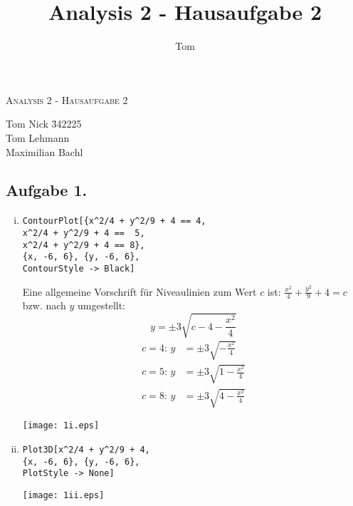 \documentclass[10pt,a4paper]{scrartcl}
\author{Tom}
\title{Analysis 2 - Hausaufgabe 2}
\begin{document}
\begin{center}
\textsc{\Large{Analysis 2 - Hausaufgabe 2}} \\
\end{center}
\begin{tabbing}
Tom Nick \hspace{1.4cm}\= 342225\\
Tom Lehmann\\
Maximilian Bachl
\end{tabbing}
\subsection*{Aufgabe 1.}
\begin{enumerate}[(i)]
\item
\begin{minipage}{0.49\columnwidth}
\begin{lstlisting}[caption= Mathematica Code für die Niveaulinien von h]
ContourPlot[{x^2/4 + y^2/9 + 4 == 4, 
x^2/4 + y^2/9 + 4 ==  5, 
x^2/4 + y^2/9 + 4 == 8}, 
{x, -6, 6}, {y, -6, 6},
ContourStyle -> Black]
\end{lstlisting}
Eine allgemeine Vorschrift für Niveaulinien zum Wert $c$ ist: $\frac{x^2}{4} + \frac{y^2}{9} + 4 =c$ bzw. nach $y$ umgestellt: $$y = \pm3\sqrt{c -4 - \frac{x^2}{4}}$$
\begin{align*}
c=4\text{: } y&= \pm 3\sqrt{-\frac {x^2}4}\\
c=5\text{: } y&= \pm 3\sqrt{1-\frac{x^2}4}\\
c=8\text{: } y&= \pm 3\sqrt{4-\frac{x^2}4}
\end{align*}
\end{minipage}
\begin{minipage}{0.49\columnwidth}
\begin{center}
\texttt{[image: 1i.eps]} 
\end{center}
\end{minipage}
\item 
\begin{minipage}{0.50\columnwidth}
\begin{lstlisting}[caption= Mathematica Code für den Graph von h]
Plot3D[x^2/4 + y^2/9 + 4, 
{x, -6, 6}, {y, -6, 6},
PlotStyle -> None]
\end{lstlisting}
\end{minipage}
\begin{minipage}{0.50\columnwidth}
\begin{center}
\texttt{[image: 1ii.eps]} 
\end{center}

\end{minipage}
\end{enumerate}
\end{document}
